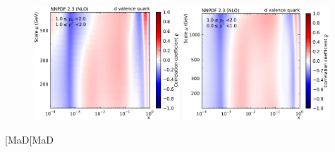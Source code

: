 \begin{figure}[htbp]
    \includegraphics[width=0.49\textwidth]{figures/pdf_constraints/corr_PTMAXEXPYS_YBYS_NLO_FINALBINS_NNPDF23_d_valence_quark_ys1_0yb1_0_cl.pdf}\hfill
    \includegraphics[width=0.49\textwidth]{figures/pdf_constraints/corr_PTMAXEXPYS_YBYS_NLO_FINALBINS_NNPDF23_d_valence_quark_ys0_0yb0_0_cl.pdf}\hfill
    \caption{}
    \label{fig:pdfconstraints_gluon}
\end{figure}
[MaD[MaD
